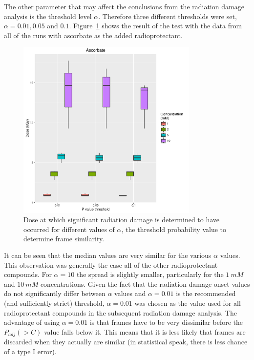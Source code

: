 The other parameter that may affect the conclusions from the radiation damage analysis is the threshold level $\alpha$. Therefore three different thresholds were set, $\alpha = 0.01, 0.05$ and $0.1$.
Figure~\ref{fig:alpha threshold value test} shows the result of the test with the data from all of the runs with ascorbate as the added radioprotectant.
\begin{figure}
    \centering
    \includegraphics[width=0.8\textwidth]{figures/saxs/Ascorbate_PThresh_comp.pdf}
    \caption{Dose at which significant radiation damage is determined to have occurred for different values of $\alpha$, the threshold probability value to determine frame similarity.}
    \label{fig:alpha threshold value test}
\end{figure}
It can be seen that the median values are very similar for the various $\alpha$ values.
This observation was generally the case all of the other radioprotectant compounds.
For $\alpha = 10$ the spread is slightly smaller, particularly for the $1\ mM$ and $10\ mM$ concentrations.
Given the fact that the radiation damage onset values do not significantly differ between $\alpha$ values and $\alpha = 0.01$ is the recommended (and sufficiently strict) threshold, $\alpha = 0.01$ was chosen as the value used for all radioprotectant compounds in the subsequent radiation damage analysis.
The advantage of using $\alpha = 0.01$ is that frames have to be very dissimilar before the $P_{adj}(>C)$ value falls below it.
This means that it is less likely that frames are discarded when they actually are similar (in statistical speak, there is less chance of a type I error).
